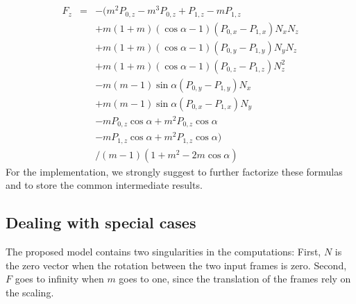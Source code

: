 \documentclass[journal, letterpaper]{IEEEtran}
\begin{document}
\begin{equation}
\begin{array}{lcl}
 F_z &=& -(m^2 P_{0,z} - m^3 P_{0,z} + P_{1,z} - m P_{1,z} \\
		&& + m (1+m) (\cos\alpha - 1) (P_{0,x} - P_{1,x}) N_x N_z \\
		&& + m (1+m) (\cos\alpha - 1) (P_{0,y} - P_{1,y}) N_y N_z \\
		&& + m (1+m) (\cos\alpha - 1) (P_{0,z} - P_{1,z}) N_z^2 \\
		&& - m (m-1) \sin\alpha (P_{0,y} - P_{1,y}) N_x \\
		&& + m (m-1) \sin\alpha (P_{0,x} - P_{1,x}) N_y \\
		&& - m P_{0,z} \cos\alpha + m^2 P_{0,z} \cos\alpha \\
		&& - m P_{1,z} \cos\alpha + m^2 P_{1,z} \cos\alpha) \\
		&& / (m-1)(1 + m^2 - 2m\cos\alpha)
\end{array}
\label{eq:Fz}
\end{equation}
For the implementation, we strongly suggest to further factorize these formulas and to store the common intermediate results.

\subsection{Dealing with special cases}
The proposed model contains two singularities in the computations: 
First, $N$ is the zero vector when the rotation between the two input frames is zero.
Second, $F$ goes to infinity when $m$ goes to one, since the translation of the frames rely on the scaling.
\end{document}
